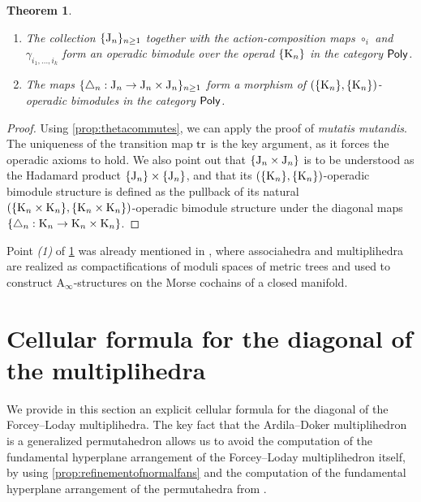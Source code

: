 \documentclass[twoside, 12pt]{amsart}
\newtheorem{theorem}{Theorem}
\theoremstyle{remark}
\begin{document}
\begin{theorem}\label{thm:MainOperad}\leavevmode
\begin{enumerate}[leftmargin=*]
\item The collection $\{\mathrm{J}_n\}_{n\geq 1}$ together with the action-composition maps $\circ_i$ and $\gamma_{i_1,\ldots,i_k}$ form an operadic bimodule over the operad $\{\mathrm{K}_n\}$ in the category $\mathsf{Poly}$. 

\item The maps $\{\triangle_n : \mathrm{J}_n \to \mathrm{J}_n\times \mathrm{J}_n\}_{n\geq 1}$ form a morphism of $(\{\mathrm{K}_n\},\{\mathrm{K}_n\})$-operadic bimodules in the category $\mathsf{Poly}$. 
\end{enumerate}
\end{theorem}

\begin{proof}
Using \cref{prop:thetacommutes}, we can apply the proof of \cite[Theorem~1]{MTTV19} \emph{mutatis mutandis}. The uniqueness of the transition map $\mathrm{tr}$ is the key argument, as it forces the operadic axioms to hold. We also point out that $\{ \mathrm{J}_n\times \mathrm{J}_n \}$ is to be understood as the Hadamard product $\{ \mathrm{J}_n \} \times \{ \mathrm{J}_n \}$, and that its $(\{\mathrm{K}_n\},\{\mathrm{K}_n\})$-operadic bimodule structure is defined as the pullback of its natural $(\{\mathrm{K}_n \times \mathrm{K}_n\},\{\mathrm{K}_n \times \mathrm{K}_n\})$-operadic bimodule structure under the diagonal maps $\{ \triangle_n : \mathrm{K}_n \to \mathrm{K}_n \times \mathrm{K}_n \}$.
\end{proof}

Point \textit{(1)} of \cref{thm:MainOperad} was already mentioned in \cite{Mazuir21}, where associahedra and multiplihedra are realized as compactifications of moduli spaces of metric trees and used to construct $\mathrm{A}_\infty$-structures on the Morse cochains of a closed manifold.


\section{Cellular formula for the diagonal of the multiplihedra} \label{sec:III}

We provide in this section an explicit cellular formula for the diagonal of the Forcey--Loday multiplihedra. 
The key fact that the Ardila--Doker multiplihedron is a generalized permutahedron allows us to avoid the computation of the fundamental hyperplane arrangement of the Forcey--Loday multiplihedron itself, by using \cref{prop:refinementofnormalfans} and the computation of the fundamental hyperplane arrangement of the permutahedra from \cite{LA21}. 
\end{document}
